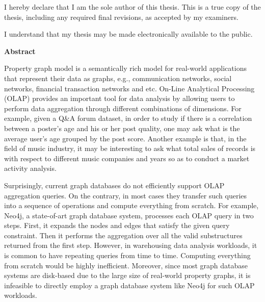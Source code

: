 \cleardoublepage %
 


  \noindent
I hereby declare that I am the sole author of this thesis. This is a true copy of the thesis, including any required final revisions, as accepted by my examiners.

  \bigskip
  
  \noindent
I understand that my thesis may be made electronically available to the public.

\cleardoublepage


\begin{center}\textbf{Abstract}\end{center}


Property graph model is a semantically rich model for real-world applications that represent their data as graphs, e.g., communication networks, social networks, financial transaction networks and etc. On-Line Analytical Processing (OLAP) provides an important tool for data analysis by allowing users to perform data aggregation through different combinations of dimensions. For example, given a Q\&A forum dataset, in order to study if there is a correlation between a poster's age and his or her post quality, one may ask what is the average user's age grouped by the post score. Another example is that, in the field of music industry, it may be interesting to ask what total sales of records is with respect to different music companies and years so as to conduct a market activity analysis.


Surprisingly, current graph databases do not efficiently support OLAP aggregation queries. On the contrary, in most cases they transfer such queries into a sequence of operations and compute everything from scratch. For example, Neo4j, a state-of-art graph database system, processes each OLAP query in two steps. First, it expands the nodes and edges that satisfy the given query constraint. Then it performs the aggregation over all the valid substructures returned from the first step. However, in warehousing data analysis workloads, it is common to have repeating queries from time to time. Computing everything from scratch would be highly inefficient. Moreover, since most graph database systems are disk-based due to the large size of real-world property graphs, it is infeasible to directly employ a graph database system like Neo4j for such OLAP workloads. %

